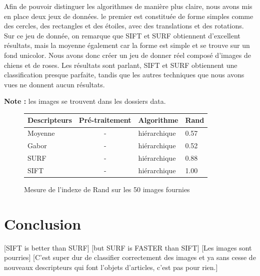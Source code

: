 \documentclass[12pt,a4paper,utf8x]{report}
\begin{document}
  Afin de pouvoir distinguer les algorithmes de manière plus claire, nous avons mis en place deux jeux de données. le premier est constituée de forme simples comme des cercles, des rectangles et des étoiles, avec des translations et des rotations. Sur ce jeu de donnée, on remarque que SIFT et SURF obtiennent d'excellent résultats, mais la moyenne également car la forme est simple et se trouve sur un fond unicolor. Nous avons donc créer un jeu de donner réel composé d'images de chiens et de roses. Les résultats sont parlant, SIFT et SURF obtiennent une classification presque parfaite, tandis que les autres techniques que nous avons vues ne donnent aucun résultats.

  \textbf{Note : } les images se trouvent dans les dossiers data.

  \begin{figure}[!h]
      \centering
        \begin{tabular}{ | l | c | l | l |}
          \hline
          Descripteurs & Pré-traitement & Algorithme & Rand \\
          \hline
            Moyenne & -             & hiérarchique          & 0.57\\
            Gabor   & -             & hiérarchique          & 0.52\\
            SURF    & -             & hiérarchique          & 0.88\\
            SIFT    & -             & hiérarchique          & 1.00\\
          \hline  
        \end{tabular}
    \caption{Mesure de l'indexe de Rand sur les 50 images fournies}
  \end{figure}


\chapter{Conclusion}
    [SIFT is better than SURF]
    [but SURF is FASTER than SIFT]
    [Les images sont pourries]
    [C'est super dur de classifier correctement des images et ya sans cesse de nouveaux descripteurs qui font l'objets d'articles, c'est pas pour rien.]

  
\end{document}

